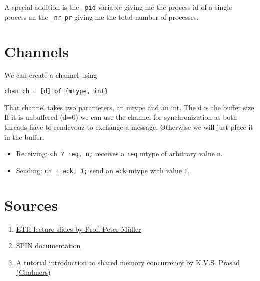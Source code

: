 \documentclass{sciposter}
\begin{document}
\begin{multicols}{3}
A special addition is the \texttt{\_pid} variable giving me the process id of a single process an the \texttt{\_nr\_pr} giving me the total number of processes.


\section*{Channels}

We can create a channel using
\begin{lstlisting}[language=promela]
chan ch = [d] of {mtype, int}
\end{lstlisting}
That channel takes two parameters, an mtype and an int. The \texttt{d} is the buffer size. If it is unbuffered (d=0) we can use the channel for synchronization as both threads have to rendevouz to exchange a message. Otherwise we will just place it in the buffer.
\begin{itemize}
	\item Receiving: \texttt{ch ? req, n;} receives a \texttt{req} mtype of arbitrary value \texttt{n}.
	\item Sending: \texttt{ch ! ack, 1;} send an \texttt{ack} mtype with value \texttt{1}.
\end{itemize} 


\section*{Sources}

\begin{enumerate}
	\item \href{https://infsec.ethz.ch/education/ss2020/fmfp.html}{ETH lecture slides by Prof. Peter Müller}
	\item \href{https://spinroot.com/spin/Man/mtype.html}{SPIN documentation}
	\item \href{http://www.cse.chalmers.se/edu/year/2017/course/TDA384_LP1/files/exercises/promela-tutoria1l-shared-mem-conc.pdf}{A tutorial introduction to shared memory concurrency by K.V.S. Prasad (Chalmers)}
\end{enumerate}




\newpage


\end{multicols}
\end{document}
